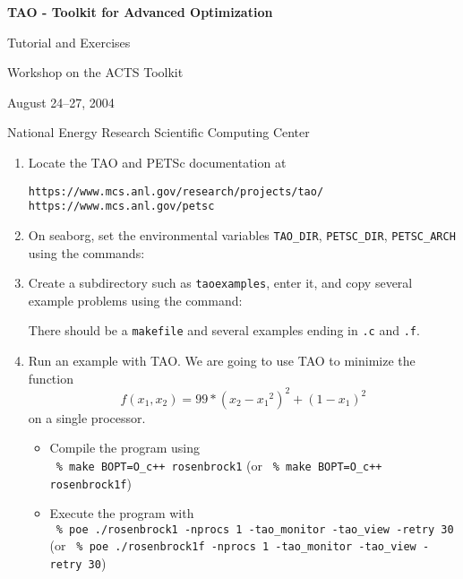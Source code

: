 \documentclass[11pt]{article}
\begin{document}
\begin{center}
{\bf
TAO - Toolkit for Advanced Optimization
        
Tutorial and Exercises

\vspace{0.25in}

Workshop on the ACTS Toolkit

August 24--27, 2004

National Energy Research Scientific Computing Center
}
\end{center}
\vspace{0.25in}

\begin{enumerate}

\item Locate the TAO and PETSc documentation at 
\begin{alltt}
https://www.mcs.anl.gov/research/projects/tao/
https://www.mcs.anl.gov/petsc
\end{alltt}

\item On seaborg, set the environmental variables
\texttt{TAO\_DIR}, \texttt{PETSC\_DIR}, \texttt{PETSC\_ARCH} 
using the commands:
\begin{alltt}
% module load tao/1.7
% module load petsc/2.2.1
\end{alltt}

\item Create a subdirectory such as \texttt{taoexamples}, enter it, and copy several example problems using the
command:
\begin{alltt}
% mkdir taoexamples
% cd taoexamples
% cp -R \$TAO_DIR/src/unconstrained/examples/tutorials/* .
% ls
\end{alltt}
There should be a \texttt{makefile} and several examples ending in \texttt{.c} and \texttt{.f}.

\item Run an example with TAO.
We are going to use TAO to minimize the function 
\[
    f(x_1,x_2) = 99*(x_2-{x_1}^2)^2 + (1-x_1)^2 
\]
on a single processor.
\begin{itemize}

 \item Compile the program using \\
  \quad \texttt{ \% make BOPT=O\_c++ rosenbrock1} 
  (or \texttt{ \% make BOPT=O\_c++ rosenbrock1f})

 \item Execute the program with \\
  \quad \texttt{ \% poe ./rosenbrock1 -nprocs 1 -tao\_monitor -tao\_view -retry 30} (or
  \texttt{ \% poe ./rosenbrock1f -nprocs 1 -tao\_monitor -tao\_view -retry 30})


\end{itemize}
\end{enumerate}
\end{document}
